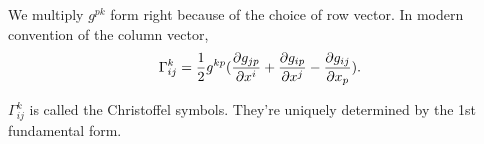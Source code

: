 \begin{remark}
    We multiply \(g^{pk}\) form right because of the choice of row vector. In
    modern convention of the column vector, \[
        \Gamma_{ij}^k=\frac{1}{2}g^{kp}(\pdv{g_{jp}}{x^i}+\pdv{g_{ip}}{x^j}
        -\pdv{g_{ij}}{x_{p}})
    .\] 
\end{remark}
\begin{definition}
    \(\Gamma_{ij}^k\) is called the Christoffel symbols. They're uniquely determined
    by the 1st fundamental form.
\end{definition}


\newpage
